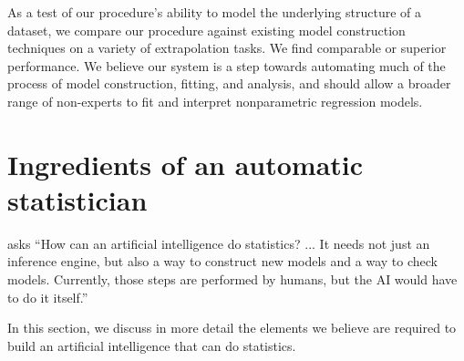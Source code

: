 \documentclass[letterpaper]{article}
\begin{document}

As a test of our procedure's ability to model the underlying structure of a dataset, we compare our procedure against existing model construction techniques on a variety of extrapolation tasks. We find comparable or superior performance. We believe our system is a step towards automating much of the process of model construction, fitting, and analysis, and should allow a broader range of non-experts to fit and interpret nonparametric regression models.




\iffalse

\section{Ingredients of an automatic statistician}
\label{sec:ingredients}
\citet{gelman2013philblogpost} asks ``How can an artificial intelligence do statistics? ... It needs not just an inference engine, but also a way to construct new models and a way to check models. Currently, those steps are performed by humans, but the AI would have to do it itself.''


In this section, we discuss in more detail the elements we believe are required to build an artificial intelligence that can do statistics.
\end{document}
